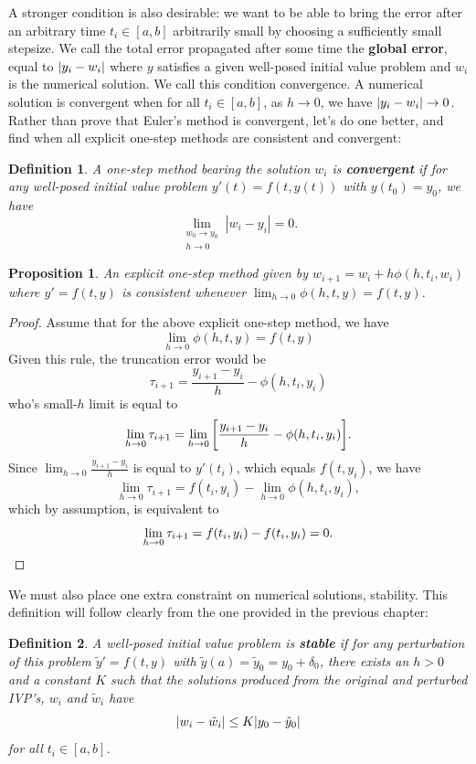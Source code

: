 \documentclass{article}
\newtheorem{definition}{Definition}[section]
\newtheorem{proposition}{Proposition}[section]
\newcommand{\0}{\vb{0}}
\newcommand{\h}{\vb{h}}
\begin{document}
A stronger condition is also desirable: we want to be able to bring the error after an arbitrary time $t_i \in [a, b]$ arbitrarily small by choosing a sufficiently small stepsize. We call the total error propagated after some time the \textbf{global error}, equal to $\qty|y_i - w_i|$ where $y$ satisfies a given well-posed initial value problem and $w_i$ is the numerical solution. We call this condition convergence. A numerical solution is convergent when for all $t_i \in [a, b]$, as $h\to0$, we have $\qty|y_i - w_i| \to 0$. Rather than prove that Euler's method is convergent, let's do one better, and find when all explicit one-step methods are consistent and convergent:
\begin{definition}
  A one-step method bearing the solution $w_i$ is \textbf{convergent} if for any well-posed initial value problem $y'(t) = f(t, y(t))$ with $y(t_0) = y_0$, we have
  \[\lim_{\substack{w_0 \to y_0\\h\to0}}|w_i - y_i| = 0.\]
\end{definition}

\begin{proposition}
  An explicit one-step method given by $w_{i+1} = w_i + h\phi(h, t_i, w_i)$ where $y' = f(t, y)$ is consistent whenever $\lim_{h\to0}\phi(h, t, y) = f(t, y)$.
\end{proposition}
\begin{proof}
  Assume that for the above explicit one-step method, we have 
  \[\lim_{h\to0}\phi(h, t, y) = f(t, y)\]
  Given this rule, the truncation error would be
  \[\tau_{i+1} = \frac{y_{i+1} - y_i}{h} - \phi(h, t_i, y_i)\]
  who's small-$h$ limit is equal to
  \[\lim_{h\to0}\tau_{i+1} = \lim_{h\to0}\qty[\frac{y_{i+1} - y_i}{h} - \phi(h, t_i, y_i)].\]
  Since $\lim_{h\to0}\frac{y_{i+1} - y_i}{h}$ is equal to $y'(t_i)$, which equals $f(t, y_i)$, we have
  \[\lim_{h\to0}\tau_{i+1} = f(t_i, y_i) - \lim_{h\to0}\phi(h, t_i, y_i),\]
  which by assumption, is equivalent to
  \[\lim_{h\to0}\tau_{i+1} = f(t_i, y_i) - f(t_i, y_i) = 0.\qedhere\]
\end{proof}
We must also place one extra constraint on numerical solutions, stability. This definition will follow clearly from the one provided in the previous chapter:
\begin{definition}
  A well-posed initial value problem is \textbf{stable} if for any perturbation of this problem $\tilde{y}' = f(t, y)$ with $\tilde{y}(a) = \tilde{y}_0 = y_0 + \delta_0$, there exists an $h > 0$ and a constant $K$ such that the solutions produced from the original and perturbed IVP's, $w_i$ and $\tilde{w}_i$ have
  \[\qty|w_i - \tilde{w}_i| \leq K\qty|y_0 - \tilde{y}_0|\]
  for all $t_i \in [a, b]$.
\end{definition}
\end{document}
